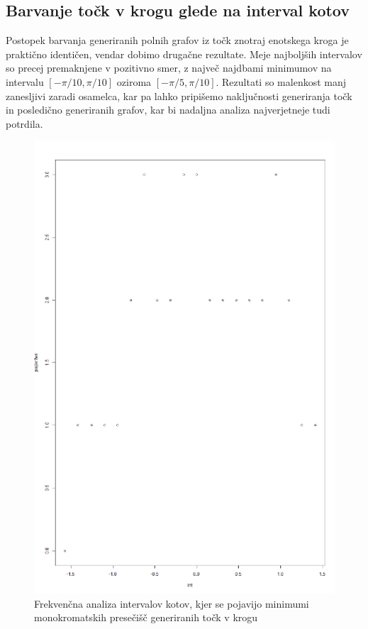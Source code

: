 \documentclass[12pt, a4paper]{article}
\begin{document}
	\subsection{Barvanje točk v krogu glede na interval kotov}
	Postopek barvanja generiranih polnih grafov iz točk znotraj enotskega kroga je praktično identičen, vendar dobimo drugačne rezultate. Meje najboljših  intervalov so precej premaknjene v pozitivno smer, z največ najdbami minimumov na intervalu $\left[{-\pi/10, \pi/10}\right]$ oziroma $\left[{-\pi/5, \pi/10}\right]$. Rezultati so malenkost manj zanesljivi zaradi osamelca, kar pa lahko pripišemo naključnosti generiranja točk in posledično generiranih grafov, kar bi nadaljna analiza najverjetneje tudi potrdila.
	\begin{figure}[h!]
	\caption{Frekvenčna analiza intervalov kotov, kjer se pojavijo minimumi monokromatskih presečišč generiranih točk v krogu}
	\includegraphics[scale=0.6]{frekvencni_krog}
	\centering
	\end{figure}
\end{document}
